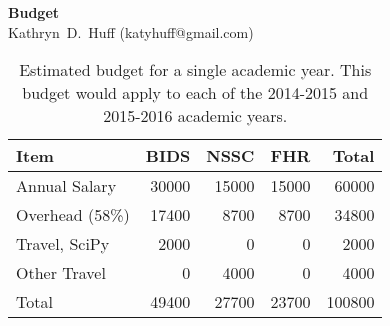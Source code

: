 \documentclass[a4paper, 10pt]{article}
\makeatletter
\newcommand{\authorname}{Kathryn~D.~Huff }
\newcommand{\authoremail}{katyhuff@gmail.com}
\newcommand{\authorsite}{katyhuff.github.com}
\makeatother
\begin{document}
\pagestyle{fancy}
\lhead{\textcolor{gray}{\it \authorname}}
\rhead{\textcolor{gray}{\thepage/\totalpages{}}}
\renewcommand{\headrulewidth}{0pt} 
\renewcommand{\footrulewidth}{0pt} 
\fancyfoot[C]{\footnotesize \textcolor{gray}{\authorsite}} 

\begin{center}
{\LARGE \bf Budget}\\
\vspace*{0.1cm}
{\normalsize \authorname (\authoremail)}
\end{center}






\begin{table}[h!]
  \centering
  \begin{tabular}{|l|r|r|r|r|}
    \hline
    \textbf{Item} & \textbf{BIDS } & \textbf{NSSC} & \textbf{FHR} & \textbf{Total}\\
    \hline
    Annual Salary  & 30000 & 15000 & 15000 & 60000\\
    Overhead (58\%)  & 17400 & 8700 & 8700 & 34800\\
    Travel, SciPy & 2000 & 0 & 0 & 2000\\
    Other Travel & 0 & 4000 & 0 & 4000\\
    Total & 49400 & 27700 & 23700 & 100800\\
    \hline
  \end{tabular}
  \caption{Estimated budget for a single academic year. This budget would apply 
    to each of the 2014-2015 and 2015-2016 academic years.}
  \label{tab:budget}
\end{table}
\end{document}
